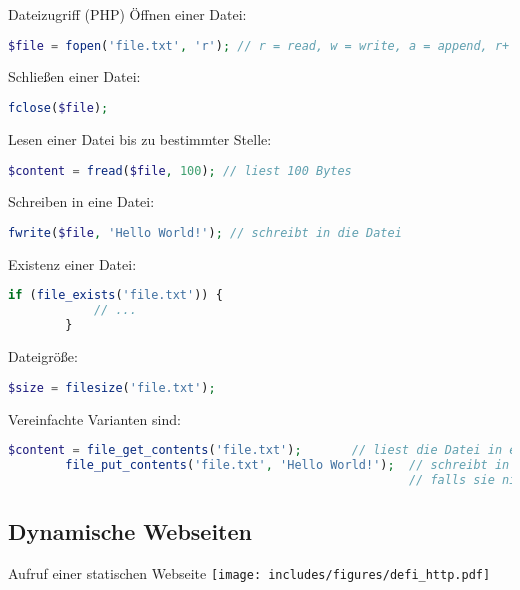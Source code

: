 \begin{bonus}{Dateizugriff (PHP)}
    Öffnen einer Datei:
    \begin{lstlisting}[language=php]
        $file = fopen('file.txt', 'r'); // r = read, w = write, a = append, r+ = read/write
    \end{lstlisting}

    Schließen einer Datei:
    \begin{lstlisting}[language=php]
        fclose($file);
    \end{lstlisting}

    Lesen einer Datei bis zu bestimmter Stelle:
    \begin{lstlisting}[language=php]
        $content = fread($file, 100); // liest 100 Bytes
    \end{lstlisting}

    Schreiben in eine Datei:
    \begin{lstlisting}[language=php]
        fwrite($file, 'Hello World!'); // schreibt in die Datei
    \end{lstlisting}

    Existenz einer Datei:
    \begin{lstlisting}[language=php]
        if (file_exists('file.txt')) {
            // ...
        }
    \end{lstlisting}

    Dateigröße:
    \begin{lstlisting}[language=php]
        $size = filesize('file.txt');
    \end{lstlisting}

    Vereinfachte Varianten sind:
    \begin{lstlisting}[language=php]
        $content = file_get_contents('file.txt');       // liest die Datei in einen String
        file_put_contents('file.txt', 'Hello World!');  // schreibt in die Datei,
                                                        // falls sie nicht existiert wird sie erstellt
    \end{lstlisting}

\end{bonus}

\subsection{Dynamische Webseiten}

\begin{bonus}{Aufruf einer statischen Webseite}
    \centering
    \texttt{[image: includes/figures/defi\_http.pdf]}
\end{bonus}

